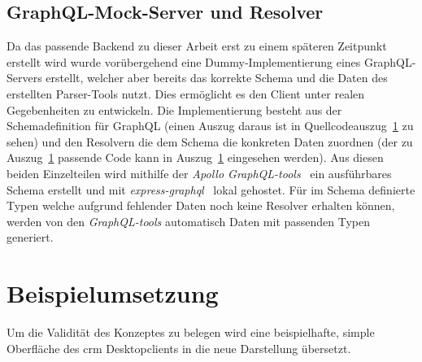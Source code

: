 \subsection{GraphQL-Mock-Server und Resolver}
Da das passende Backend zu dieser Arbeit erst zu einem späteren Zeitpunkt erstellt wird wurde vorübergehend eine Dummy-Implementierung eines GraphQL-Servers erstellt, welcher aber bereits das korrekte Schema und die Daten des erstellten Parser-Tools nutzt. Dies ermöglicht es den Client unter realen Gegebenheiten zu entwickeln. Die Implementierung besteht aus der Schemadefinition für GraphQL (einen Auszug daraus ist in Quellcodeauszug~\ref{} zu sehen) und den Resolvern die dem Schema die konkreten Daten zuordnen (der zu Auszug~\ref{} passende Code kann in Auszug~\ref{} eingesehen werden). Aus diesen beiden Einzelteilen wird mithilfe der \textit{Apollo GraphQL-tools}~\parencite{apollo_graphql-tools_2019} ein ausführbares Schema erstellt und mit \textit{express-graphql}~\parencite{express_graphql_2018} lokal gehostet. Für im Schema definierte Typen welche aufgrund fehlender Daten noch keine Resolver erhalten können, werden von den \textit{GraphQL-tools} automatisch Daten mit passenden Typen generiert.

\section{Beispielumsetzung}
Um die Validität des Konzeptes zu belegen wird eine beispielhafte, simple Oberfläche des \gls{crm} Desktopclients in die neue Darstellung übersetzt.
